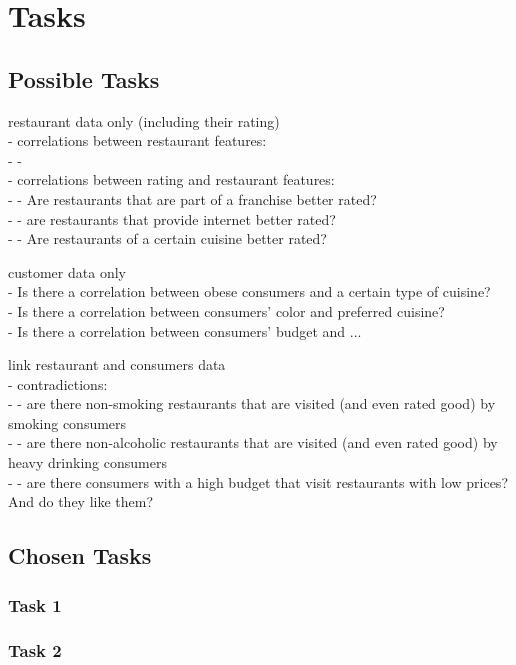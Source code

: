 \section{Tasks}\label{sec:tasks}


\subsection{Possible Tasks}

restaurant data only (including their rating)
\\- correlations between restaurant features:
\\- -
\\- correlations between rating and restaurant features:
\\- - Are restaurants that are part of a franchise better rated?
\\- - are restaurants that provide internet better rated?
\\- - Are restaurants of a certain cuisine better rated?


customer data only
\\- Is there a correlation between obese consumers and a certain type of cuisine?
\\- Is there a correlation between consumers' color and preferred cuisine?
\\- Is there a correlation between consumers' budget and ...


link restaurant and consumers data
\\- contradictions: 
\\- - are there non-smoking restaurants that are visited (and even rated good) by smoking consumers 
\\- - are there non-alcoholic restaurants that are visited (and even rated good) by heavy drinking consumers
\\- - are there consumers with a high budget that visit restaurants with low prices? And do they like them?
\\


\subsection{Chosen Tasks}



\subsubsection{Task 1}\label{sec:task1}


\subsubsection{Task 2}\label{sec:task2}

